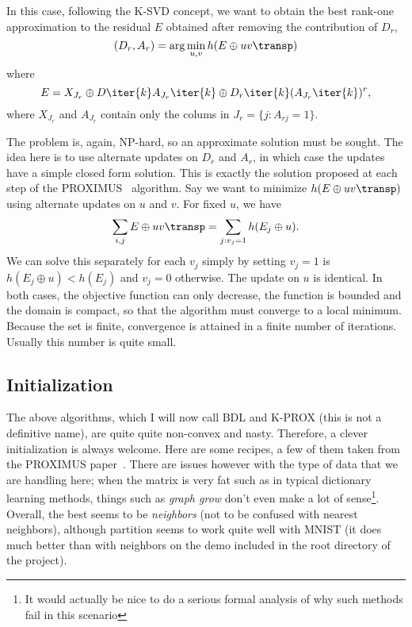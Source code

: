 \documentclass[a4paper]{IEEEtran}
\begin{document}
In this case, following the K-SVD concept, we want to obtain the best rank-one approximation to the residual $E$ obtained after removing the contribution of $D_r$, 
\begin{equation}
(D_r,A_r) = \arg\min_{u,v} h(E \oplus uv\transp)
\label{eq:bsvd1}
\end{equation}
where
\begin{equation}
E =  X_{J_r} \oplus D\iter{k}A_{J_r}\iter{k} \oplus D_r\iter{k}(A_{J_r}\iter{k})^r,
\label{eq:bsvd2}
\end{equation}
where $X_{J_r}$ and $A_{J_r}$ contain only the colums in $J_r = \{j: A_{rj} = 1 \}$.

The problem   is, again, NP-hard, so an approximate solution must be sought. The idea here is to use alternate updates on $D_r$ and $A_r$, in which case the updates have a simple closed form solution. This is exactly the solution proposed at each step of the PROXIMUS~\cite{proximus} algorithm. Say we want to minimize $h(E \oplus uv\transp)$ using alternate updates on $u$ and $v$. For fixed $u$, we have
$$
\sum_{i,j} E \oplus uv\transp = \sum_{j: v_j = 1} h(E_j \oplus u).
$$
We can solve this separately for each $v_j$ simply by setting $v_j = 1$ is $h(E_j \oplus u) < h(E_j)$ and $v_j=0$ otherwise. The update on $u$ is identical. In both cases, the objective function can only decrease, the function is bounded and the domain is compact, so that the algorithm must converge to a local minimum. Because the set is finite, convergence is attained in a finite number of iterations. Usually this number is quite small.


\subsection{Initialization}

The above algorithms, which I will now call BDL and K-PROX (this is not a definitive name), are
quite quite non-convex and nasty. Therefore, a clever initialization is always welcome. Here are
some recipes, a few of them taken from the PROXIMUS paper~\cite{proximus}. There are issues however
with the type of data that we are handling here; when the matrix is very fat such as in typical
dictionary learning methods, things such as \emph{graph grow} don't even make a lot of
sense\footnote{It would actually be nice to do a serious formal analysis of why such methods fail in
  this scenario}. Overall, the best seems to be \emph{neighbors} (not to be confused with nearest neighbors), although partition seems to
work quite well with MNIST (it does much better than with neighbors on the demo included in the root
directory of the project).
\end{document}
